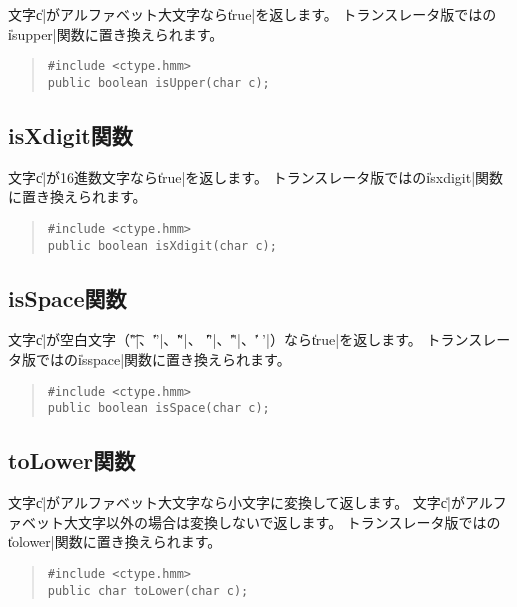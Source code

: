 文字\|c|がアルファベット大文字なら\|true|を返します。
トランスレータ版では\cl の\|isupper|関数に置き換えられます。

\begin{quote}
\begin{verbatim}
#include <ctype.hmm>
public boolean isUpper(char c);
\end{verbatim}
\end{quote}

\subsection{isXdigit関数}

文字\|c|が16進数文字なら\|true|を返します。
トランスレータ版では\cl の\|isxdigit|関数に置き換えられます。

\begin{quote}
\begin{verbatim}
#include <ctype.hmm>
public boolean isXdigit(char c);
\end{verbatim}
\end{quote}

\subsection{isSpace関数}

文字\|c|が空白文字（\|'\t'|、\|'\n'|、\|'\v'|、
\|'\f'|、\|'\r'|、\|' '|）なら\|true|を返します。
トランスレータ版では\cl の\|isspace|関数に置き換えられます。

\begin{quote}
\begin{verbatim}
#include <ctype.hmm>
public boolean isSpace(char c);
\end{verbatim}
\end{quote}

\subsection{toLower関数}

文字\|c|がアルファベット大文字なら小文字に変換して返します。
文字\|c|がアルファベット大文字以外の場合は変換しないで返します。
トランスレータ版では\cl の\|tolower|関数に置き換えられます。

\begin{quote}
\begin{verbatim}
#include <ctype.hmm>
public char toLower(char c);
\end{verbatim}
\end{quote}

